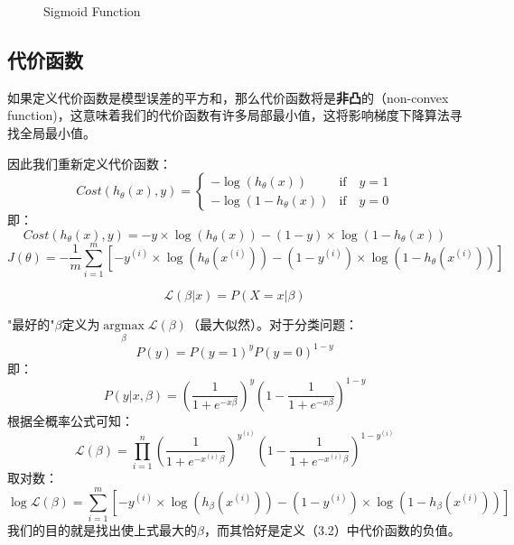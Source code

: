 \documentclass[cn,hazy,blue,normal,14pt]{elegantnote}
\begin{document}


\begin{figure}[h]
\begin{center}
\end{center}
\caption{Sigmoid Function}
\end{figure}
\subsection{代价函数}
如果定义代价函数是模型误差的平方和，那么代价函数将是\textbf{非凸}的（non-convex function)，这意味着我们的代价函数有许多局部最小值，这将影响梯度下降算法寻找全局最小值。

因此我们重新定义代价函数：
$$
Cost(h_\theta(x),y)=\begin{cases}
    -\log(h_\theta(x)) & \text{if}\quad  y=1 \\
    -\log(1-h_\theta(x)) & \text{if} \quad y=0
\end{cases}
$$
即：
$$
Cost(h_\theta(x),y)=-y\times \log(h_\theta(x))-(1-y)\times \log(1-h_\theta(x)) 
$$
$$
J(\theta)=-\frac{1}{m} \sum_{i=1}^{m} [-y^{(i)}\times \log(h_\theta(x^{(i)}))-(1-y^{(i)})\times \log(1-h_\theta(x^{(i)}))]
$$

\begin{note}
\begin{definition}[似然函数]
$$
\mathcal{L}(\beta|x)=P(X=x|\beta)
$$
\end{definition}
"最好的"$\beta$定义为$\mathop{\text{argmax}}\limits_\beta \mathcal{L}(\beta)$（最大似然）。对于分类问题：
$$
P(y)=P(y=1)^yP(y=0)^{1-y} 
$$
即：
$$
P(y|x,\beta)=(\frac{1}{1+e^{-x\beta}})^y(1-\frac{1}{1+e^{-x\beta}})^{1-y}
$$
根据全概率公式可知：
$$
\mathcal{L}(\beta)=\prod_{i=1}^{n}(\frac{1}{1+e^{-x^{(i)}\beta}})^{y^{(i)}}(1-\frac{1}{1+e^{-x^{(i)
}\beta}})^{1-y^{(i)}}
$$
取对数：
$$
\log \mathcal{L}(\beta)=\sum_{i=1}^{m} [-y^{(i)}\times \log(h_\beta(x^{(i)}))-(1-y^{(i)})\times \log(1-h_\beta(x^{(i)}))]
$$
我们的目的就是找出使上式最大的$\beta$，而其恰好是定义（3.2）中代价函数的负值。
\end{note}
\end{document}
